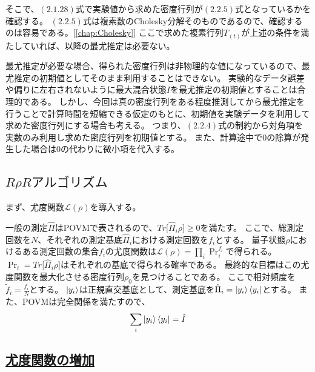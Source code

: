 \documentclass[11pt,a4j,notitlepage]{jreport}
\begin{document}
	そこで、$(2.1.28)$式で実験値から求めた密度行列が$(2.2.5)$式となっているかを確認する。
	$(2.2.5)$式は複素数のCholesky分解そのものであるので、確認するのは容易である。[\autoref{chap:Cholesky}]
	ここで求めた複素行列$T_{(t)}$が上述の条件を満たしていれば、以降の最尤推定は必要ない。

	最尤推定が必要な場合、得られた密度行列は非物理的な値になっているので、最尤推定の初期値としてそのまま利用することはできない。
	実験的なデータ誤差や偏りに左右されないように最大混合状態$I$を最尤推定の初期値とすることは合理的である。
	しかし、今回は真の密度行列をある程度推測してから最尤推定を行うことで計算時間を短縮できる仮定のもとに、初期値を実験データを利用して求めた密度行列にする場合も考える。
	つまり、$(2.2.4)$式の制約から対角項を実数のみ利用し求めた密度行列を初期値とする。
	また、計算途中で0の除算が発生した場合は0の代わりに微小項を代入する。

	\subsection{$R \rho Rアルゴリズム$}

	まず、尤度関数$\mathcal{L} (\rho)$を導入する。

	一般の測定$\hat{\Pi}$はPOVMで表されるので、$Tr \big[ \hat{\Pi}_i \rho \big] \geq 0$を満たす。
	ここで、総測定回数を$N$、それぞれの測定基底$\hat{\Pi}_i$における測定回数を$f_i$とする。
	量子状態$\rho$におけるある測定回数の集合{$f_i$}の尤度関数は$\mathcal{L} (\rho) = \prod_i \Pr_i^{f_i}$で得られる。
	$\Pr_i = Tr \big[ \hat{\Pi}_i \rho \big]$はそれぞれの基底で得られる確率である。
	最終的な目標はこの尤度関数を最大化させる密度行列$\rho_0$を見つけることである。
	ここで相対頻度を$\tilde{f}_i = \frac{f_i}{N}$とする。
	$\ket{y_i}$は正規直交基底として、測定基底を$\hat{\Pi}_i = \ket{y_i} \bra{y_i}$とする。
	また、POVMは完全関係を満たすので、
	\begin{equation}
		\sum_i \ket{y_i} \bra{y_i} = \hat{I}
	\end{equation}

	\subsection*{\underline{尤度関数の増加}}
\end{document}
